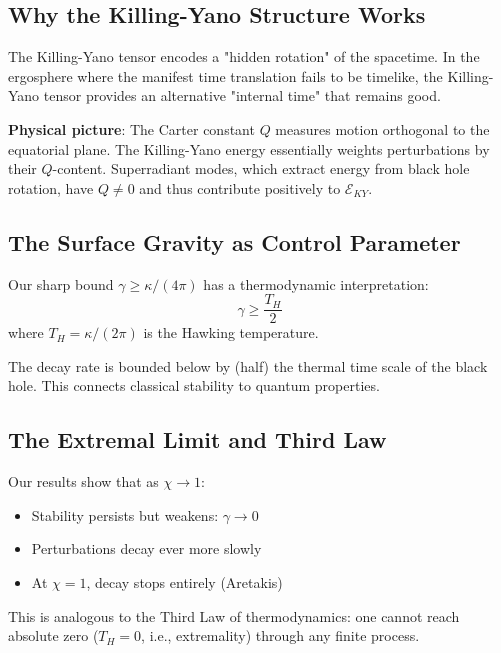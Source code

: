 \documentclass[12pt,a4paper]{article}
\begin{document}
\subsection{Why the Killing-Yano Structure Works}

The Killing-Yano tensor encodes a "hidden rotation" of the spacetime. In the ergosphere where the manifest time translation fails to be timelike, the Killing-Yano tensor provides an alternative "internal time" that remains good.

\textbf{Physical picture}: The Carter constant $Q$ measures motion orthogonal to the equatorial plane. The Killing-Yano energy essentially weights perturbations by their $Q$-content. Superradiant modes, which extract energy from black hole rotation, have $Q \neq 0$ and thus contribute positively to $\mathcal{E}_{KY}$.

\subsection{The Surface Gravity as Control Parameter}

Our sharp bound $\gamma \geq \kappa/(4\pi)$ has a thermodynamic interpretation:
\begin{equation}
\gamma \geq \frac{T_H}{2}
\end{equation}
where $T_H = \kappa/(2\pi)$ is the Hawking temperature.

The decay rate is bounded below by (half) the thermal time scale of the black hole. This connects classical stability to quantum properties.

\subsection{The Extremal Limit and Third Law}

Our results show that as $\chi \to 1$:
\begin{itemize}
    \item Stability persists but weakens: $\gamma \to 0$
    \item Perturbations decay ever more slowly
    \item At $\chi = 1$, decay stops entirely (Aretakis)
\end{itemize}

This is analogous to the Third Law of thermodynamics: one cannot reach absolute zero ($T_H = 0$, i.e., extremality) through any finite process.

\end{document}
